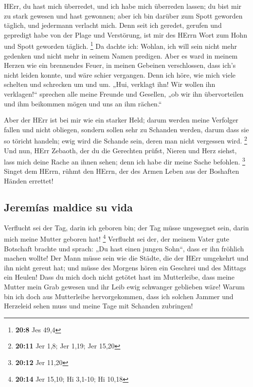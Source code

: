  HErr, du hast mich überredet, und ich habe mich überreden
lassen; du bist mir zu stark gewesen und hast gewonnen; aber ich bin
darüber zum Spott geworden täglich, und jedermann verlacht mich.
 Denn seit ich geredet, gerufen und gepredigt habe von der
Plage und Verstörung, ist mir des HErrn Wort zum Hohn und Spott geworden
täglich. \footnote{\textbf{20:8} Jes 49,4}  Da dachte ich:
Wohlan, ich will sein nicht mehr gedenken und nicht mehr in seinem Namen
predigen. Aber es ward in meinem Herzen wie ein brennendes Feuer, in
meinen Gebeinen verschlossen, dass ich's nicht leiden konnte, und wäre
schier vergangen.  Denn ich höre, wie mich viele schelten
und schrecken um und um. „Hui, verklagt ihn! Wir wollen ihn
verklagen!{}`` sprechen alle meine Freunde und Gesellen, „ob wir ihn
übervorteilen und ihm beikommen mögen und uns an ihm rächen.``

 Aber der HErr ist bei mir wie ein starker Held; darum
werden meine Verfolger fallen und nicht obliegen, sondern sollen sehr zu
Schanden werden, darum dass sie so töricht handeln; ewig wird die
Schande sein, deren man nicht vergessen wird. \footnote{\textbf{20:11}
  Jer 1,8; Jer 1,19; Jer 15,20}  Und nun, HErr Zebaoth,
der du die Gerechten prüfst, Nieren und Herz siehst, lass mich deine
Rache an ihnen sehen; denn ich habe dir meine Sache befohlen.
\footnote{\textbf{20:12} Jer 11,20}  Singet dem HErrn,
rühmt den HErrn, der des Armen Leben aus der Boshaften Händen errettet!

\hypertarget{jeremuxedas-maldice-su-vida}{%
\subsection{Jeremías maldice su
vida}\label{jeremuxedas-maldice-su-vida}}

 Verflucht sei der Tag, darin ich geboren bin; der Tag
müsse ungesegnet sein, darin mich meine Mutter geboren hat! \footnote{\textbf{20:14}
  Jer 15,10; Hi 3,1-10; Hi 10,18}  Verflucht sei der, der
meinem Vater gute Botschaft brachte und sprach: „Du hast einen jungen
Sohn``, dass er ihn fröhlich machen wollte!  Der Mann
müsse sein wie die Städte, die der HErr umgekehrt und ihn nicht gereut
hat; und müsse des Morgens hören ein Geschrei und des Mittags ein
Heulen!  Dass du mich doch nicht getötet hast im
Mutterleibe, dass meine Mutter mein Grab gewesen und ihr Leib ewig
schwanger geblieben wäre!  Warum bin ich doch aus
Mutterleibe hervorgekommen, dass ich solchen Jammer und Herzeleid sehen
muss und meine Tage mit Schanden zubringen!

